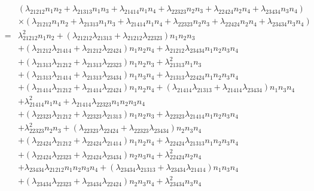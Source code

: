 \documentclass[12pt]{article}
\begin{document}
\begin{eqnarray*}
&&\left( \lambda _{21212}n_{1}n_{2}+\lambda _{21313}n_{1}n_{3}+\lambda
_{21414}n_{1}n_{4}+\lambda _{22323}n_{2}n_{3}+\lambda
_{22424}n_{2}n_{4}+\lambda _{23434}n_{3}n_{4}\right) \\
&&\times \left( \lambda _{21212}n_{1}n_{2}+\lambda
_{21313}n_{1}n_{3}+\lambda _{21414}n_{1}n_{4}+\lambda
_{22323}n_{2}n_{3}+\lambda _{22424}n_{2}n_{4}+\lambda
_{23434}n_{3}n_{4}\right) \\
&=&\lambda _{21212}^{2}n_{1}n_{2}+\left( \lambda _{21212}\lambda
_{21313}+\lambda _{21212}\lambda _{22323}\right) n_{1}n_{2}n_{3} \\
&&+\left( \lambda _{21212}\lambda _{21414}+\lambda _{21212}\lambda
_{22424}\right) n_{1}n_{2}n_{4}+\lambda _{21212}\lambda
_{23434}n_{1}n_{2}n_{3}n_{4} \\
&&+\left( \lambda _{21313}\lambda _{21212}+\lambda _{21313}\lambda
_{22323}\right) n_{1}n_{2}n_{3}+\lambda _{21313}^{2}n_{1}n_{3} \\
&&+\left( \lambda _{21313}\lambda _{21414}+\lambda _{21313}\lambda
_{23434}\right) n_{1}n_{3}n_{4}+\lambda _{21313}\lambda
_{22424}n_{1}n_{2}n_{3}n_{4} \\
&&+\left( \lambda _{21414}\lambda _{21212}+\lambda _{21414}\lambda
_{22424}\right) n_{1}n_{2}n_{4}+\left( \lambda _{21414}\lambda
_{21313}+\lambda _{21414}\lambda _{23434}\right) n_{1}n_{3}n_{4} \\
&&+\lambda _{21414}^{2}n_{1}n_{4}+\lambda _{21414}\lambda
_{22323}n_{1}n_{2}n_{3}n_{4} \\
&&+\left( \lambda _{22323}\lambda _{21212}+\lambda _{22323}\lambda
_{21313}\right) n_{1}n_{2}n_{3}+\lambda _{22323}\lambda
_{21414}n_{1}n_{2}n_{3}n_{4} \\
&&+\lambda _{22323}^{2}n_{2}n_{3}+\left( \lambda _{22323}\lambda
_{22424}+\lambda _{22323}\lambda _{23434}\right) n_{2}n_{3}n_{4} \\
&&+\left( \lambda _{22424}\lambda _{21212}+\lambda _{22424}\lambda
_{21414}\right) n_{1}n_{2}n_{4}+\lambda _{22424}\lambda
_{21313}n_{1}n_{2}n_{3}n_{4} \\
&&+\left( \lambda _{22424}\lambda _{22323}+\lambda _{22424}\lambda
_{23434}\right) n_{2}n_{3}n_{4}+\lambda _{22424}^{2}n_{2}n_{4} \\
&&+\lambda _{23434}\lambda _{21212}n_{1}n_{2}n_{3}n_{4}+\left( \lambda
_{23434}\lambda _{21313}+\lambda _{23434}\lambda _{21414}\right)
n_{1}n_{3}n_{4} \\
&&+\left( \lambda _{23434}\lambda _{22323}+\lambda _{23434}\lambda
_{22424}\right) n_{2}n_{3}n_{4}+\lambda _{23434}^{2}n_{3}n_{4}
\end{eqnarray*}%
\end{document}
